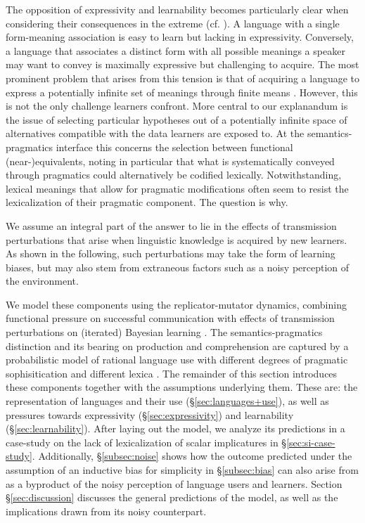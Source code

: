 \documentclass[a4paper]{article}
\begin{document}
The opposition of expressivity and learnability becomes particularly clear when considering their consequences in the extreme (cf. \citealt{kemp+regier:2012,kirby+etal:2015}). A language with a single form-meaning association is easy to learn but lacking in expressivity. Conversely, a language that associates a distinct form with all possible meanings a speaker may want to convey is maximally expressive but challenging to acquire. The most prominent problem that arises from this tension is that of acquiring a language to express a potentially infinite set of meanings through finite means \citep{kirby:2002}. However, this is not the only challenge learners confront. More central to our explanandum is the issue of selecting particular hypotheses out of a potentially infinite space of alternatives compatible with the data learners are exposed to. At the semantics-pragmatics interface this concerns the selection between functional (near-)equivalents, noting in particular that what is systematically conveyed through pragmatics could alternatively be codified lexically. Notwithstanding, lexical meanings that allow for pragmatic modifications often seem to resist the lexicalization of their pragmatic component. The question is why.

We assume an integral part of the answer to lie in the effects of transmission perturbations that arise when linguistic knowledge is acquired by new learners. As shown in the following, such perturbations may take the form of learning biases, but may also stem from extraneous factors such as a noisy perception of the environment.


We model these components using the replicator-mutator dynamics, combining functional pressure on successful communication with effects of transmission perturbations on (iterated) Bayesian learning \citep{griffiths+kalish:2007}. The semantics-pragmatics distinction and its bearing on production and comprehension are captured by a probabilistic model of rational language use with different degrees of pragmatic sophisitication and different lexica \citep{frank+goodman:2012,franke+jaeger:2014, bergen+etal:2016}. The remainder of this section introduces these components together with the assumptions underlying them. These are: the representation of languages and their use (\S\ref{sec:languages+use}), as well as pressures towards expressivity (\S\ref{sec:expressivity}) and learnability (\S\ref{sec:learnability}). After laying out the model, we analyze its predictions in a case-study on the lack of lexicalization of scalar implicatures in \S\ref{sec:si-case-study}. Additionally, \S\ref{subsec:noise} shows how the outcome predicted under the assumption of an inductive bias for simplicity in \S\ref{subsec:bias} can also arise from as a byproduct of the noisy perception of language users and learners. Section \S\ref{sec:discussion} discusses the general predictions of the model, as well as the implications drawn from its noisy counterpart.
\end{document}
